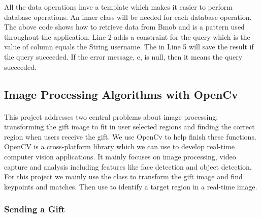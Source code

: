 \par All the data operations have a template which makes it easier to perform database operations. An inner class will be needed for each database operation. The above code shows how to retrieve data from Bmob and is a pattern used throughout the application. Line 2 adds a constraint for the query which is the value of  column equals the String username. The  in Line 5 will save the result if the query succeeded. If the error message, {\ttfamily e}, is null, then it means the query succeeded. 

\subsection{Image Processing Algorithms with OpenCv}
\paragraph{}This project addresses two central problems about image processing: transforming the gift image to fit in user selected regions and finding the correct region when users receive the gift. We use OpenCv to help finish these functions. OpenCV is a cross-platform library which we can use to develop real-time computer vision applications. It mainly focuses on image processing, video capture and analysis including features like face detection and object detection. For this project we mainly use the  class to transform the gift image and find keypoints and matches. Then use  to identify a target region in a real-time image. 

\subsubsection{Sending a Gift}
